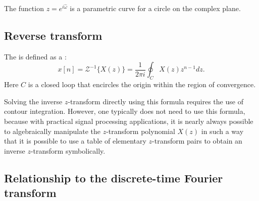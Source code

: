 \begin{marginfigure}
  \begin{center}
  \end{center}
  \caption{The function $z=e^{i\hat{\omega}}$ is a parametric curve for a circle on the complex plane.}
\end{marginfigure}

\subsection{Reverse transform}
The  is defined as
a :
\begin{equation}
  \boxed{
    x[n] = \mathcal{Z}^{-1}\{X(z)\} =  \frac{1}{2 \pi i} \oint_{C} X(z) z^{n-1} dz}.
  \label{izteq}
\end{equation}
Here $C$ is a closed loop that encircles the origin within the region
of convergence.

Solving the inverse $z$-transform directly using this formula requires
the use of contour integration. However, one typically does not
need to use this formula, because with practical signal processing
applications, it is nearly always possible to algebraically manipulate
the $z$-transform polynomial $X(z)$ in such a way that it is possible to
use a table of elementary $z$-transform pairs to obtain an inverse
$z$-transform symbolically.

\subsection{Relationship to the discrete-time Fourier transform}

